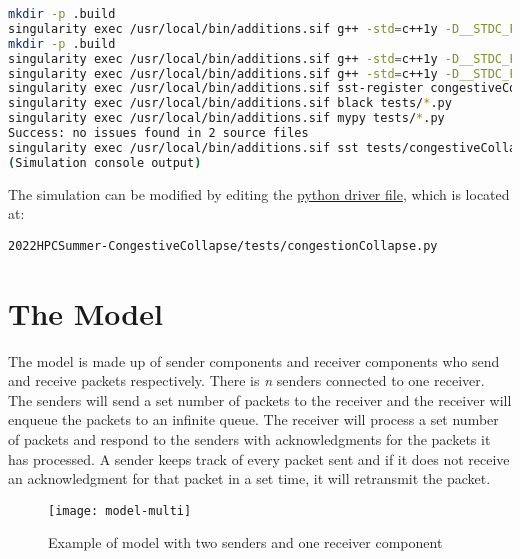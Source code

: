\documentclass{article}
\begin{document}
\begin{lstlisting}[language=bash, frame=none]
mkdir -p .build
singularity exec /usr/local/bin/additions.sif g++ -std=c++1y -D__STDC_FORMAT_MACROS -fPIC -DHAVE_CONFIG_H -I/opt/SST/11.1.0/include -MMD -c receiver.cc -o .build/receiver.o
mkdir -p .build
singularity exec /usr/local/bin/additions.sif g++ -std=c++1y -D__STDC_FORMAT_MACROS -fPIC -DHAVE_CONFIG_H -I/opt/SST/11.1.0/include -MMD -c sender.cc -o .build/sender.o
singularity exec /usr/local/bin/additions.sif g++ -std=c++1y -D__STDC_FORMAT_MACROS -fPIC -DHAVE_CONFIG_H -I/opt/SST/11.1.0/include -shared -fno-common -Wl,-undefined -Wl,dynamic_lookup -o libcongestiveCollapse.so .build/receiver.o .build/sender.o
singularity exec /usr/local/bin/additions.sif sst-register congestiveCollapse congestiveCollapse_LIBDIR=/home/{USER}/sst-work/2022HPCSummer-CongestiveCollapse
singularity exec /usr/local/bin/additions.sif black tests/*.py
singularity exec /usr/local/bin/additions.sif mypy tests/*.py
Success: no issues found in 2 source files
singularity exec /usr/local/bin/additions.sif sst tests/congestiveCollapse.py
(Simulation console output)
\end{lstlisting}

\noindent The simulation can be modified by editing the \href{http://sst-simulator.org/SSTPages/SSTUserPythonFileFormat/}{python driver file}, which is located at:

\begin{verbatim}
2022HPCSummer-CongestiveCollapse/tests/congestionCollapse.py
\end{verbatim}

\section{The Model}

The model is made up of sender components and receiver components who send and receive packets respectively. There is \textit{n} senders connected to one receiver. The senders will send a set number of packets to the receiver and the receiver will enqueue the packets to an infinite queue. The receiver will process a set number of packets and respond to the senders with acknowledgments for the packets it has processed. A sender keeps track of every packet sent and if it does not receive an acknowledgment for that packet in a set time, it will retransmit the packet.

\begin{figure}[H]
	\texttt{[image: model-multi]}
	\centering
	\caption{Example of model with two senders and one receiver component}
\end{figure}
\end{document}
